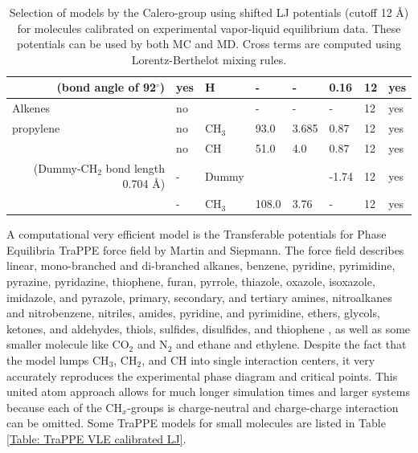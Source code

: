 \begin{table}[H]
\begin{tabular}{p{5.5cm}|p{1.5cm}|p{1.3cm}|p{1.3cm}|p{1.0cm}|p{1.15cm}|p{1.0cm}|p{1.0cm}}
\multicolumn{1}{r|}{(bond angle of 92$^\circ$)}    & yes  & H     & -   & -   &  0.16 & 12 & yes\\
\hline
Alkenes \cite{Liu2008} & no  &       & -   & -   &  -    & 12 & yes\\
\hline
propylene \cite{GutierrezSevillano2010} & no  & CH$_3$  & 93.0 & 3.685 & 0.87 & 12 & yes\\
                   & no  & CH  & 51.0 & 4.0 & 0.87 & 12 & yes\\
\multicolumn{1}{r|}{(Dummy-CH$_2$ bond length 0.704 \AA)} & -   & Dummy &      &     & -1.74 & 12 & yes\\
                   & -   & CH$_3$ & 108.0 & 3.76 & - & 12 & yes\\
\end{tabular}
\caption{Selection of models by the Calero-group using shifted LJ potentials (cutoff 12 \AA)
 for molecules calibrated on experimental vapor-liquid equilibrium data.
 These potentials can be used by both MC and MD.
 Cross terms are computed using Lorentz-Berthelot mixing rules.}
\label{Table: Calero VLE calibrated LJ}
\end{table}

A computational very efficient model is the Transferable potentials for Phase Equilibria  TraPPE force field by Martin and Siepmann\cite{Martin1998,Martin1999}.
The force field describes linear, mono-branched and di-branched alkanes\cite{Martin1998,Martin1999},
benzene, pyridine, pyrimidine, pyrazine, pyridazine, thiophene, furan, pyrrole, thiazole, oxazole, isoxazole, imidazole, and pyrazole\cite{Rai2007},
primary, secondary, and tertiary amines, nitroalkanes and nitrobenzene, nitriles, amides, pyridine, and pyrimidine\cite{Wick2005a},
ethers, glycols, ketones, and aldehydes\cite{Stubbs2004},
thiols, sulfides, disulfides, and thiophene \cite{Lubna2005}, as well as some smaller molecule
like CO$_2$ and N$_2$ \cite{Potoff2001} and ethane and ethylene\cite{Shah2017}.
Despite the fact that the model lumps CH$_3$, CH$_2$, and CH into single interaction centers, it very accurately
reproduces the experimental phase diagram and critical points.
This united atom approach allows for much longer simulation times and larger systems because each of the CH$_x$-groups is
charge-neutral and charge-charge interaction can be omitted.
Some TraPPE models for small molecules are listed in Table \ref{Table: TraPPE VLE calibrated LJ}.


